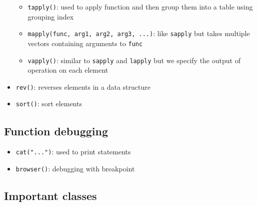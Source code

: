 \documentclass{article}
\begin{document}
\begin{multicols}{2}
\begin{itemize}
\begin{itemize}
		\item \texttt{tapply()}: used to apply function and then group them into a table using grouping index
		\item \texttt{mapply(func, arg1, arg2, arg3, ...)}: like \texttt{sapply} but takes multiple vectors containing arguments to \texttt{func}
		\item \texttt{vapply()}: similar to \texttt{sapply} and \texttt{lapply} but we specify the output of operation on each element
	\end{itemize}
    \item \texttt{rev()}: reverses elements in a data structure
    \item \texttt{sort()}: sort elements
\end{itemize}
\subsection*{Function debugging}
\begin{itemize}
	\item \texttt{cat("...")}: used to print statements
	\item \texttt{browser()}: debugging with breakpoint
\end{itemize}
\subsection*{Important classes}

\end{multicols}
\end{document}
